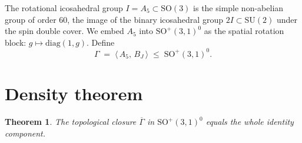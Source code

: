 \documentclass[11pt]{article}
\newtheorem{theorem}{Theorem}
\theoremstyle{remark}
\begin{document}
The rotational icosahedral group $I = A_5 \subset \mathrm{SO}(3)$ is
the simple non-abelian group of order $60$, the image of the binary
icosahedral group $2I \subset \mathrm{SU}(2)$ under the spin double
cover. We embed $A_5$ into $\mathrm{SO}^+(3,1)^0$ as the spatial
rotation block: $g \mapsto \mathrm{diag}(1, g)$. Define
\[
  \Gamma \;=\; \bigl\langle\, A_5,\, B_J \,\bigr\rangle \;\leq\;
    \mathrm{SO}^+(3,1)^0.
\]


\section{Density theorem}

\begin{theorem}\label{thm:density}
The topological closure $\overline{\Gamma}$ in $\mathrm{SO}^+(3,1)^0$
equals the whole identity component.
\end{theorem}
\end{document}
